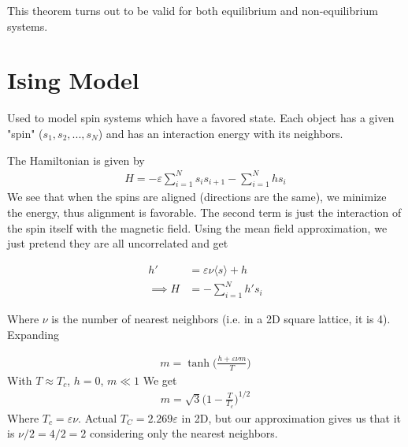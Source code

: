 This theorem turns out to be valid for both equilibrium and non-equilibrium systems.





\section{Ising Model}
Used to model spin systems which have a favored state. Each object has a given "spin" ($s_1, s_2, ..., s_N$) and has an interaction energy with its neighbors.


The Hamiltonian is given by
\begin{align}
H = -\varepsilon\sum_{i=1}^N s_is_{i+1} - \sum_{i=1}^Nh s_i
\end{align}
We see that when the spins are aligned (directions are the same), we minimize the energy, thus alignment is favorable. The second term is just the interaction of the spin itself with the magnetic field. Using the mean field approximation, we just pretend they are all uncorrelated and get

\begin{align}
h' &= \varepsilon\nu \langle s\rangle + h\\
\implies H &= -\sum_{i=1}^N h's_i
\end{align}

Where $\nu$ is the number of nearest neighbors (i.e. in a 2D square lattice, it is 4). %
Expanding 

\begin{align}
m = \tanh\Big(\frac{h + \varepsilon\nu m}{T}\Big)
\end{align}
With $T\approx T_c$, $h=0$, $m\ll 1$ We get 
\begin{align}
m = \sqrt{3}\Big(1-\frac{T}{T_c}\Big)^{1/2}
\end{align}
Where $T_c = \varepsilon\nu$. Actual $T_C = 2.269\varepsilon$ in 2D, but our approximation gives us that it is $\nu/2 = 4/2 = 2$ considering only the nearest neighbors. %

